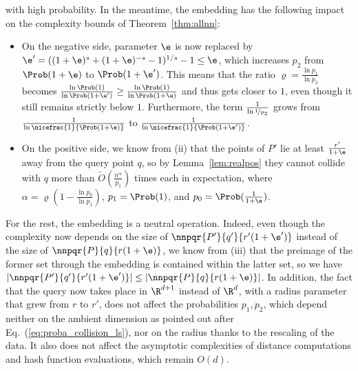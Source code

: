 with high probability. In the meantime, the embedding has the
following impact on the complexity bounds of Theorem~\ref{thm:allnn}:
\begin{itemize}
\item On the negative side, parameter $\e$ is now replaced by
  $\e'=((1+\e)^s + (1+\e)^{-s} - 1)^{1/s} - 1 \leq \e$, which
  increases $p_2$ from $\Prob(1+\e)$ to $\Prob(1+\e')$. This means
  that the ratio $\varrho = \frac{\ln p_1}{\ln p_2}$ becomes
  $\frac{\ln \Prob(1)}{\ln \Prob(1+\e')} \geq \frac{\ln \Prob(1)}{\ln
    \Prob(1+\e)}$ and thus gets closer to $1$, even though it still
  remains strictly below $1$. Furthermore, the term $\frac{1}{\ln
    \nicefrac{1}{p_2}}$ grows from
  $\frac{1}{\ln \nicefrac{1}{\Prob(1+\e)}}$ to $\frac{1}{\ln
    \nicefrac{1}{\Prob(1+\e')}}$.
\item On the positive side, we know from (ii) that the points of $P'$
  lie at least $\frac{r'}{1+\e}$ away from the query point $q$, so by
  Lemma~\ref{lem:realpos} they cannot collide with $q$ more than
  $\tilde O(\frac{n^\alpha}{p_1})$ times each in expectation, where
  $\alpha=\varrho(1-\frac{\ln p_0}{\ln p_1})$, $p_1=\Prob(1)$, and
  $p_0=\Prob(\frac{1}{1+\e})$.
\end{itemize}
For the rest, the embedding is a neutral operation. Indeed, even
though the complexity now depends on the size of
$\nnpqr{P'}{q'}{r'(1+\e')}$ instead of the size of
$\nnpqr{P}{q}{r(1+\e)}$, we know from (iii) that the preimage of the
former set through the embedding is contained within the latter set,
so we have $|\nnpqr{P'}{q'}{r'(1+\e')}|\leq |\nnpqr{P}{q}{r(1+\e)}|$.
In addition, the fact that the query now takes place in $\R^{d+1}$
instead of $\R^d$, with a radius parameter that grew from $r$ to $r'$,
does not affect the probabilities $p_1, p_2$, which depend neither on
the ambient dimension as pointed out after
Eq.~(\ref{eq:proba_collision_ls}), nor on the radius thanks to the
rescaling of the data. It also does not affect the asymptotic complexities
of distance computations and hash function evaluations, which remain
$O(d)$.


